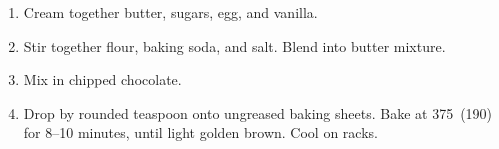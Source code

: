 
\begin{ingredients}
\end{ingredients}


\begin{recipe}
  \begin{enumerate}

  \item Cream together butter, sugars, egg, and vanilla.

  \item Stir together flour, baking soda, and salt.  Blend into butter
    mixture.

  \item Mix in chipped chocolate.

  \item Drop by rounded teaspoon onto ungreased baking sheets.  Bake
    at 375\F\ (190\C) for 8--10 minutes, until light golden brown.  Cool on
    racks.

  \end{enumerate}
\end{recipe}
